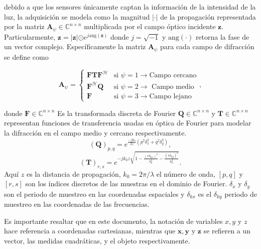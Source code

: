 debido a que los sensores únicamente captan la información de la intensidad de la luz, la adquisición se modela como la magnitud $\vert \cdot \vert$ de la propagación representada por la matriz $\mathbf{A}_\psi\in\mathbb{C}^{n \times n}$ multiplicada por el campo óptico incidente $\mathbf{z}$. Particularmente,  $\mathbf{z}=\vert \mathbf{z}|\odot e^{j\mathrm{ang}(\mathbf{z})}$ donde $j=\sqrt{-1}$ y $\mathrm{ang}(\cdot)$ retorna la fase de un vector complejo. Específicamente la matriz $\mathbf{A}_\psi$ para cada campo de difracción se define como

\begin{equation}
    \mathbf{A}_\psi = \left\{\begin{matrix}
 \mathbf{F}\mathbf{T}\mathbf{F}^\mathcal{H}    & \text{si } \psi=1\rightarrow \text{Campo cercano}\\ 
 \mathbf{F}^\mathcal{H}\mathbf{Q} &\text{si } \psi=2\rightarrow\text{ Campo medio} \\ 
 \mathbf{F}  &\text{si } \psi=3\rightarrow\text{Campo lejano}
\end{matrix}\right., \label{eq:matrix_a_no_coded}
\end{equation}

donde $\mathbf{F}\in\mathbb{C}^{n\times n}$ Es la transformada discreta de Fourier $\mathbf{Q}\in\mathbb{C}^{n\times n}$ y $\mathbf{T}\in\mathbb{C}^{n\times n}$ representan funciones de transferencia usadas en óptica de Fourier  para modelar la difracción en el campo medio y cercano respectivamente.
\begin{equation}
(\mathbf{Q})_{p,q}=e^{\frac{-jk_0}{2z}(p^2\delta_x^2+q^2\delta_y^2)},\label{eq:Qfuncion}
\end{equation}
\begin{equation}
(\mathbf{T})_{r,s}=e^{-jk_0z\sqrt{1-\frac{(r\delta_{kx})^2}{k_0^2}-\frac{(s\delta_{ky})^2}{k_0^2}}}.\label{eq:Tfuncion}
\end{equation}
Aquí $z$ es la distancia de propagación, $k_0=2\pi/\lambda$ el número de onda, $[p,q]$ y $[r,s]$ son los índices discretos de las muestras en el dominio de Fourier. $\delta_x$ y $\delta_y$ son el periodo de muestreo en las coordenadas espaciales y $\delta_{kx}$ es el $\delta_{ky}$ periodo de muestreo en las coordenadas de las frecuencias. 

Es importante resaltar que en este documento, la notación de variables $x, y$ y $z$ hace referencia a coordenadas cartesianas, mientras que $\mathbf{x}, \mathbf{y}$ y $\mathbf{z}$ se refieren a un vector, las medidas cuadráticas,
y el objeto respectivamente.



